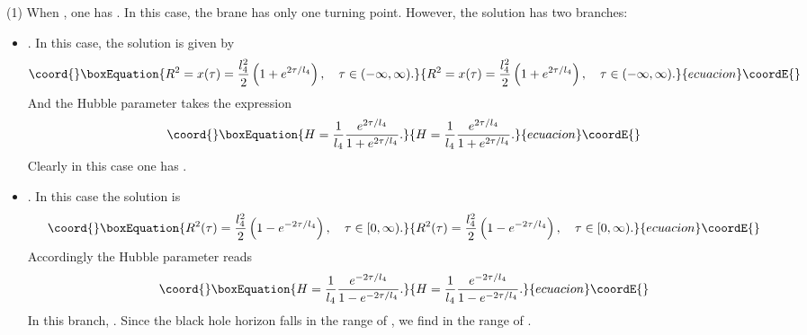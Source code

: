 \documentclass[a4paper,12pt]{article}
\begin{document}
(1) When \coordHE{}, one has \coordHE{}.  In this case, the brane 
has only one turning point. However, the solution has
two branches:
\begin{itemize}
\item  \myHighlight{$ x \in [x_+,\infty)$}\coordHE{}. In this case, the solution is given by
   \begin{equation}\coord{}\boxEquation{
   \label{3eq16}
   R^2 =x(\tau)= \frac{l^2_4}{2}\left(1 +e^{2\tau/l_4}\right), \ \
    \ \tau \in (-\infty, \infty).
   }{
   R^2 =x(\tau)= \frac{l^2_4}{2}\left(1 +e^{2\tau/l_4}\right), \ \
    \ \tau \in (-\infty, \infty).
   }{ecuacion}\coordE{}\end{equation}
   And the Hubble parameter takes the expression
   \begin{equation}\coord{}\boxEquation{
   H =\frac{1}{l_4}\frac{e^{2\tau/l_4}}{1+e^{2\tau/l_4}}.
   }{
   H =\frac{1}{l_4}\frac{e^{2\tau/l_4}}{1+e^{2\tau/l_4}}.
   }{ecuacion}\coordE{}\end{equation}
   Clearly in this case one has \coordHE{}.

\item  \myHighlight{$x \in (0, x_+]$}\coordHE{}. In this case the solution is
\begin{equation}\coord{}\boxEquation{
   R^2(\tau) = \frac{l_4^2}{2}\left(1-e^{-2\tau/l_4}\right),
     \ \ \  \tau \in [0, \infty).
}{
   R^2(\tau) = \frac{l_4^2}{2}\left(1-e^{-2\tau/l_4}\right),
     \ \ \  \tau \in [0, \infty).
}{ecuacion}\coordE{}\end{equation}
Accordingly the Hubble parameter reads
\begin{equation}\coord{}\boxEquation{
H= \frac{1}{l_4}\frac{e^{-2\tau/l_4}}{1-e^{-2\tau/l_4}}.
}{
H= \frac{1}{l_4}\frac{e^{-2\tau/l_4}}{1-e^{-2\tau/l_4}}.
}{ecuacion}\coordE{}\end{equation}
In this branch, \myHighlight{$ 0\le H < \infty$}\coordHE{}.  Since  the
black hole horizon \coordHE{} falls in the range of \myHighlight{$0 <x_{\rm BH}
< x_+$}\coordHE{},  we  find \myHighlight{$ H <1/l_4$}\coordHE{} in the range of \coordHE{}.

\end{itemize}
\end{document}
